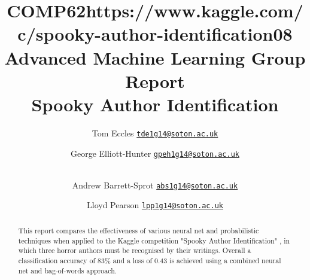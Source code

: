 \documentclass[10pt,a4paper]{ieeeconf}
\begin{document}
  \title{
  COMP62https://www.kaggle.com/c/spooky-author-identification08 Advanced Machine Learning Group Report\\
  \vspace{5mm}
    Spooky Author Identification
  }
  \author{
    Tom Eccles \texttt{\href{mailto:tde1g14@soton.ac.uk}{tde1g14@soton.ac.uk}} \and
    George Elliott-Hunter \texttt{\href{mailto:gpeh1g14@soton.ac.uk}{gpeh1g14@soton.ac.uk}} \and \\
    Andrew Barrett-Sprot \texttt{\href{mailto:abs1g14@soton.ac.uk}{abs1g14@soton.ac.uk}} \and
    Lloyd Pearson \texttt{\href{mailto:lpp1g14@soton.ac.uk}{lpp1g14@soton.ac.uk}} \and
  }

  \maketitle
  \begin{abstract}
    This report compares the effectiveness of various neural net and probabilistic techniques when applied to the Kaggle competition "Spooky Author Identification" \cite{kaggle}, in which three horror authors must be recognised by their writings. Overall a classification accuracy of 83\% and a loss of 0.43 is achieved using a combined neural net and bag-of-words approach.
  \end{abstract}
  
  
  
  
  
  
  
  
    
  \printbibliography
  
\end{document}
